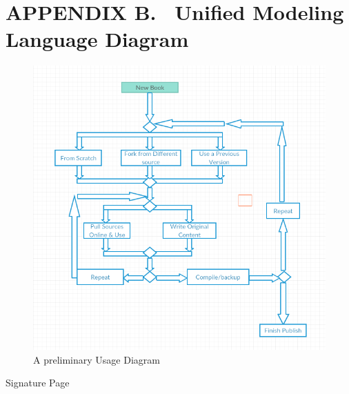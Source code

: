 \documentclass[letterpaper, 10pt, draftclsnofoot, compsoc, onecolumn]{IEEEtran}
\begin{document}
{{\clearpage
\section[APPENDIX B. \ UML Diagram]{\rmfamily\bfseries\color{black}
APPENDIX B. \ Unified Modeling Language Diagram}

\bigskip


\begin{figure}[ht!]
\centering
\includegraphics[width=150mm]{usage_diagram.png}
\caption{A preliminary Usage Diagram}
\end{figure}

\bigskip

\newpage
\centerline{\sc \large Signature Page}
\vspace{5pc}


\centering

}}
\end{document}
